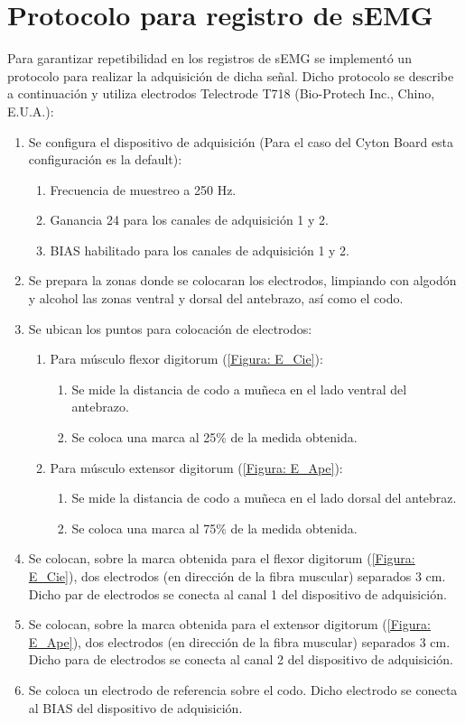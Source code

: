 \newpage
\section{Protocolo para registro de sEMG}\label{Section: ProReg}
Para garantizar repetibilidad en los registros de sEMG se implementó un protocolo para realizar la adquisición de dicha señal. Dicho protocolo se describe a continuación y utiliza electrodos Telectrode T718 (Bio-Protech Inc., Chino, E.U.A.):

\begin{enumerate}
	\item Se configura el dispositivo de adquisición (Para el caso del Cyton Board esta configuración es la default):
	\begin{enumerate}
		\item Frecuencia de muestreo a 250 Hz.
		\item Ganancia 24 para los canales de adquisición 1 y 2.
		\item BIAS habilitado para los canales de adquisición 1 y 2.
	\end{enumerate}
	\item Se prepara la zonas donde se colocaran los electrodos, limpiando con algodón y alcohol las zonas ventral y dorsal del antebrazo, así como el codo.
	\item Se ubican los puntos para colocación de electrodos:
	\begin{enumerate}
		\item Para músculo flexor digitorum (\ref{Figura: E_Cie}):
		\begin{enumerate}
			\item Se mide la distancia de codo a muñeca en el lado ventral del antebrazo.
			\item Se coloca una marca al 25\% de la medida obtenida.
		\end{enumerate}
		\item Para músculo extensor digitorum (\ref{Figura: E_Ape}):
		\begin{enumerate}
			\item Se mide la distancia de codo a muñeca en el lado dorsal del antebraz.
			\item Se coloca una marca al 75\% de la medida obtenida.
		\end{enumerate}
	\end{enumerate}
	\item Se colocan, sobre la marca obtenida para el flexor digitorum (\ref{Figura: E_Cie}), dos electrodos (en dirección de la fibra muscular) separados 3 cm. Dicho par de electrodos se conecta al canal 1 del dispositivo de adquisición.
	\item Se colocan, sobre la marca obtenida para el extensor digitorum (\ref{Figura: E_Ape}), dos electrodos (en dirección de la fibra muscular) separados 3 cm. Dicho para de electrodos se conecta al canal 2 del dispositivo de adquisición.
	\item Se coloca un electrodo de referencia sobre el codo. Dicho electrodo se conecta al BIAS del dispositivo de adquisición.
\end{enumerate}

